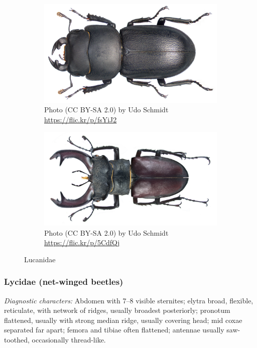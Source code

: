 \documentclass[letterpaper, 11pt]{article}
\begin{document}
\begin{figure}[ht!]
  \centering
\begin{subfigure}[ht!]{0.42\textwidth}
    \includegraphics[width=\textwidth]{LucanidHabitus2}
  \caption{Photo (CC BY-SA 2.0) by Udo Schmidt \url{https://flic.kr/p/fsYiJ2}}
  \label{fig:lucanid1}
\end{subfigure}
    \qquad
\begin{subfigure}[ht!]{0.47\textwidth}
    \includegraphics[width=\textwidth]{LucanidHabitus}
  \caption{Photo (CC BY-SA 2.0) by Udo Schmidt \url{https://flic.kr/p/5CdfQj}}
  \label{fig:lucanid}\end{subfigure}
    \caption{Lucanidae}\label{fig:lucanids}
\end{figure}

\subsubsection{Lycidae (net-winged beetles)}
\noindent{}\textit{Diagnostic characters:} Abdomen with 7--8 visible sternites; elytra broad, flexible, reticulate, with network of ridges, usually broadest posteriorly; pronotum flattened, usually with strong median ridge, usually covering head; mid coxae separated far apart; femora and tibiae often flattened; antennae usually saw-toothed, occasionally thread-like.\\
\end{document}
